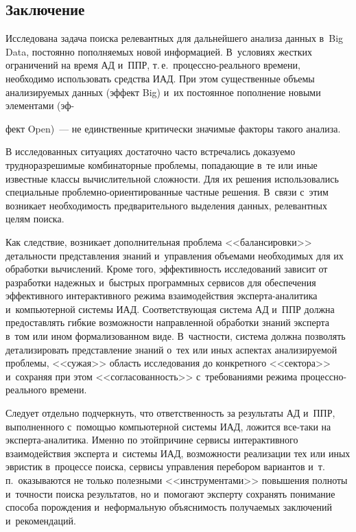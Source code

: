 \begin{multicols}{2}
\vspace*{-9pt}
  
  \section{Заключение}
  
  \vspace*{-3pt}
  
  Исследована задача поиска релевантных для дальнейшего анализа данных 
в~Big Data, постоянно пополняемых новой информацией. В~условиях жестких 
ограничений на время АД и~ППР, т.\,е.\  
про\-цес\-сно-ре\-аль\-но\-го времени, необходимо использовать средства ИАД. 
При этом существенные объемы анализируемых данных (эффект Big) и~их 
постоянное пополнение новыми элементами (эф-\linebreak\vspace*{-12pt}

\pagebreak

\noindent
фект Open)~--- не 
единственные критически значимые факторы такого анализа. 
  
  В исследованных ситуациях достаточно часто встречались доказуемо 
трудноразрешимые комбинаторные проблемы, попадающие в~те или иные 
известные классы вычислительной сложности. Для их решения использовались 
специальные проб\-лем\-но-ори\-ен\-ти\-ро\-ван\-ные частные решения. 
В~связи с~этим возникает необходимость предварительного выделения данных, 
релевантных целям поиска.
  
  Как следствие, возникает дополнительная проб\-ле\-ма <<балансировки>> 
детальности представления знаний и~управления объемами необходимых для\linebreak 
их обработки вычислений. Кроме того, эффективность исследований зависит от 
разработки на\-дежных и~быстрых программных сервисов для обеспечения 
эффективного интерактивного режима взаимодействия  
экс\-пер\-та-ана\-ли\-ти\-ка и~компьютерной системы ИАД. Соответствующая 
система АД и~ППР должна 
предоставлять гибкие возможности направленной обработки знаний эксперта 
в~том или ином формализованном виде. В~част\-ности, сис\-те\-ма должна 
позволять детализировать пред\-став\-ле\-ние знаний о~тех или иных аспектах 
анализируемой проб\-ле\-мы, <<сужая>> об\-ласть исследования до конкретного 
<<сектора>> и~сохраняя при этом <<согласованность>> с~требованиями 
режима про\-цес\-сно-ре\-аль\-но\-го времени.
  
  Следует отдельно подчеркнуть, что ответственность за результаты АД и~ППР, 
выполненного с~помощью компьютерной системы ИАД, ложится все-та\-ки на 
экс\-пер\-та-ана\-ли\-ти\-ка. Именно по этой\linebreak причине сервисы интерактивного 
взаимодействия эксперта и~системы ИАД, возможности реализации тех или 
иных эвристик в~процессе поиска, сервисы управления перебором вариантов 
и~т.\,п.\  оказываются не только полезными <<инструментами>> повышения 
полноты и~точности поиска результатов, но и~помогают эксперту сохранять 
понимание способа порождения и~неформальную объяснимость получаемых 
заключений и~рекомендаций.
  

\end{multicols}
